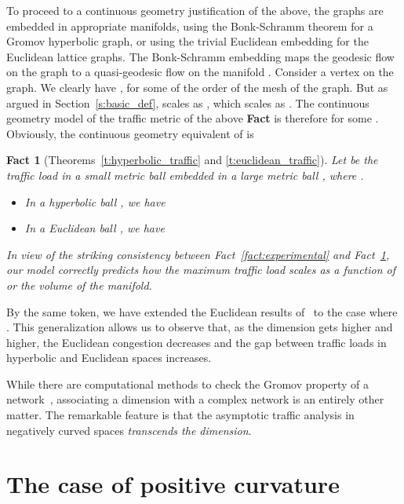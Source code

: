 \documentclass{article}
\newtheorem{fact}{Fact}
\begin{document}
To proceed to a continuous geometry justification of the above, 
the graphs are embedded in appropriate manifolds, 
using the Bonk-Schramm theorem for a Gromov hyperbolic graph, 
or using the trivial Euclidean embedding for the Euclidean lattice graphs. 
The Bonk-Schramm embedding  maps 
the geodesic flow on the graph   
to a quasi-geodesic flow on the manifold . 
Consider a vertex  on the graph. We clearly have , 
for some  of the order of the mesh of the graph.  
But as argued in Section~\ref{s:basic_def},  scales as , 
which scales as . 
The continuous geometry model 
of the traffic metric of the above {\bf Fact} is therefore  for some . 
Obviously, the continuous geometry equivalent of  is 


\begin{fact}[Theorems~\ref{t:hyperbolic_traffic} and \ref{t:euclidean_traffic}]
\label{fact:theoretical}
Let  be the traffic load in a small metric ball  embedded in a large metric ball , 
where . 
\begin{itemize}
\item In a hyperbolic ball , we have 

\item In a Euclidean ball , we have 

\end{itemize}
\end{fact}

\textit{In view of the striking consistency between Fact~\ref{fact:experimental} and Fact~\ref{fact:theoretical}, 
our model correctly predicts how the maximum traffic load scales as a function of  
or the volume of the manifold.} 

By the same token, we have extended the Euclidean results of~\cite{arXiv_dmitri} to the case where . 
This generalization allows us to observe that,  
as the dimension gets higher and higher, 
the Euclidean congestion decreases and the gap between traffic loads in hyperbolic and Euclidean spaces increases. 

While there are computational methods 
to check the Gromov property of a network~\cite{scaled_gromov,Matt_thesis,eurasip_clustering,4_point}, 
associating a dimension with a complex network is an entirely other matter. 
The remarkable feature is that the asymptotic traffic analysis in negatively curved spaces 
\textit{transcends the dimension}. 

\section{The case of positive curvature}
\end{document}
